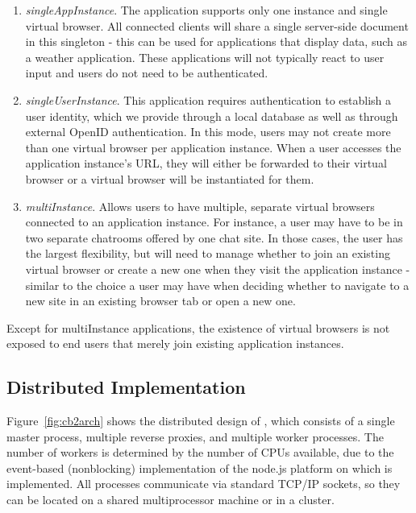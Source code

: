 \begin{enumerate}
\item \emph{singleAppInstance}. The application supports only one instance and single virtual browser.
    All connected clients will share a single server-side document in this singleton - this can be
    used for applications that display data, such as a weather application. These applications will not
    typically react to user input and users do not need to be authenticated.  
    
\item \emph{singleUserInstance}.  This application requires authentication to establish a
    user identity, which we provide through a local database as well as through external OpenID
    authentication.   In this mode, users may not create more than one virtual browser per
    application instance.  When a user accesses the application instance's URL, they will either
    be forwarded to their virtual browser or a virtual browser will be instantiated for them.
    
\item \emph{multiInstance}. 
    Allows users to have multiple, separate virtual browsers connected to an application
    instance. For instance, a user may have to be in two separate chatrooms offered by one chat site.
    In those cases, the user has the largest flexibility, but will need to manage whether
    to join an existing virtual browser or create a new one when they visit the application instance
    - similar to the choice a user may have when deciding whether to navigate to a new site in 
    an existing browser tab or open a new one.
\end{enumerate}
Except for multiInstance applications, the existence of virtual browsers is not exposed to 
end users that merely join existing application instances.

\apphierarchyfig{}
%
%
\newarchitectureoverview{}
%
\subsection{Distributed Implementation}
Figure~\ref{fig:cb2arch} shows the distributed design of \cbtwo, which consists of a single
master process, multiple reverse proxies, and multiple worker processes.  The number of workers 
is determined by the number of CPUs available, due to the event-based (nonblocking) implementation
of the node.js platform on which \cb is implemented.
All processes communicate via standard TCP/IP sockets, so they can be located on a shared multiprocessor 
machine or in a cluster.

